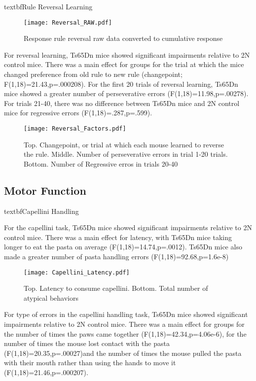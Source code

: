 \documentclass{article}
\begin{document}
textbf{Rule Reversal Learning}

\begin{figure}[h!]
\centering
\texttt{[image: Reversal\_RAW.pdf]}
\caption{Response rule reversal raw data converted to cumulative response}
\label{fig:ReversalRAW}
\end{figure}

For reversal learning, Ts65Dn mice showed significant impairments relative to 2N control mice. There was a main effect for groups for the trial at which the mice changed preference from old rule to new rule (changepoint; F(1,18)=21.43,p=.000208). For the first 20 trials of reversal learning, Ts65Dn mice showed a greater number of perseverative errors (F(1,18)=11.98,p=.00278). For trials 21-40, there was no difference between Ts65Dn mice and 2N control mice for regressive errors (F(1,18)=.287,p=.599).

\begin{figure}[h!]
\centering
\texttt{[image: Reversal\_Factors.pdf]}
\caption{Top. Changepoint, or trial at which each mouse learned to reverse the rule. Middle. Number of perseverative errors in trial 1-20 trials. Bottom. Number of Regressive erros in trials 20-40}
\label{fig:ReversalFactors}
\end{figure}

\subsection{Motor Function}

textbf{Capellini Handling}

For the capellini task, Ts65Dn mice showed significant impairments relative to 2N control mice. There was a main effect for latency, with Ts65Dn mice taking longer to eat the pasta on average (F(1,18)=14.74,p=.0012). Ts65Dn mice also made a greater number of pasta handling errors (F(1,18)=92.68,p=1.6e-8)

\begin{figure}[h!]
\centering
\texttt{[image: Capellini\_Latency.pdf]}
\caption{Top. Latency to consume capellini. Bottom. Total number of atypical behaviors}
\label{fig:CapelliniLatency}
\end{figure}

For type of errors in the capellini handling task, Ts65Dn mice showed significant impairments relative to 2N control mice. There was a main effect for groups for the number of times the paws came together (F(1,18)=42.34,p=4.06e-6), for the number of times the mouse lost contact with the pasta (F(1,18)=20.35,p=.00027)and the number of times the mouse pulled the pasta with their mouth rather than using the hands to move it (F(1,18)=21.46,p=.000207).
\end{document}
